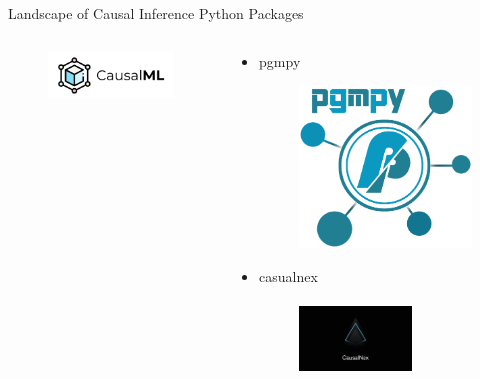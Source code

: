 \documentclass{beamer}
\begin{document}
\begin{frame}{Landscape of Causal Inference Python Packages}
\begin{columns}
\begin{column}{0.5 \textwidth}
\begin{itemize}
					\begin{figure}
						\includegraphics[scale=0.3]{imgs/causalml.png}
					\end{figure}
			\end{itemize}

		\end{column}
		\vrule
		\begin{column}{0.5 \textwidth}
			\begin{itemize}
				\item pgmpy
					\begin{figure}
						\includegraphics[scale=0.2]{imgs/pgmpy.png}
					\end{figure}
				\item casualnex
					\begin{figure}
						\includegraphics[height=2cm, width=3cm, scale=0.2]{imgs/causalnex.png}
					\end{figure}
			\end{itemize}
		\end{column}
	\end{columns}
\end{frame}
\end{document}
